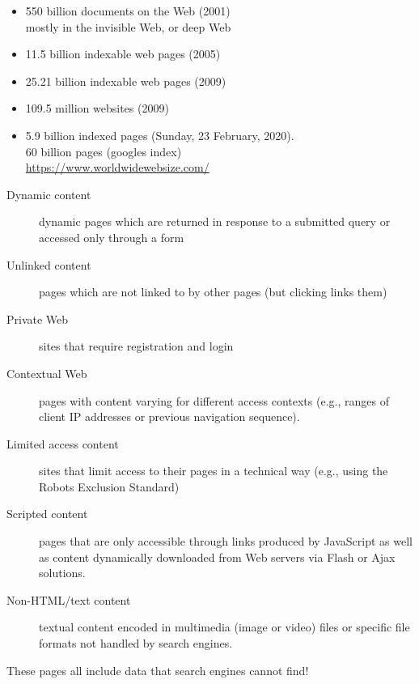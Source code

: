 \documentclass[a4paper,landscape,headrule,footrule,xetex]{foils}
\begin{document}
\begin{itemize}
\item 550 billion documents on the Web (2001)
  \\ mostly in the invisible Web, or deep Web
\item 11.5 billion indexable web pages (2005)
\item 25.21 billion indexable web pages (2009)
\item 109.5 million websites (2009)
\item 5.9 billion indexed pages (Sunday, 23 February, 2020).
  \\ 60 billion pages (googles index)
  \\ \url{https://www.worldwidewebsize.com/}
\end{itemize}

\begin{description}
\item [Dynamic content] dynamic pages which are returned in response to a submitted query or accessed only through a form
\item [Unlinked content] pages which are not linked to by other pages (but clicking links them)
\item [Private Web] sites that require registration and login
\item [Contextual Web] pages with content varying for different access contexts (e.g., ranges of client IP addresses or previous navigation sequence).
\item [Limited access content] sites that limit access to their pages
  in a technical way (e.g., using the Robots Exclusion Standard)
\item [Scripted content] pages that are only accessible through links produced by JavaScript as well as content dynamically downloaded from Web servers via Flash or Ajax solutions.
\item [Non-HTML/text content] textual content encoded in multimedia (image or video) files or specific file formats not handled by search engines.
\end{description}

These pages all include data that search engines cannot find!
\end{document}

